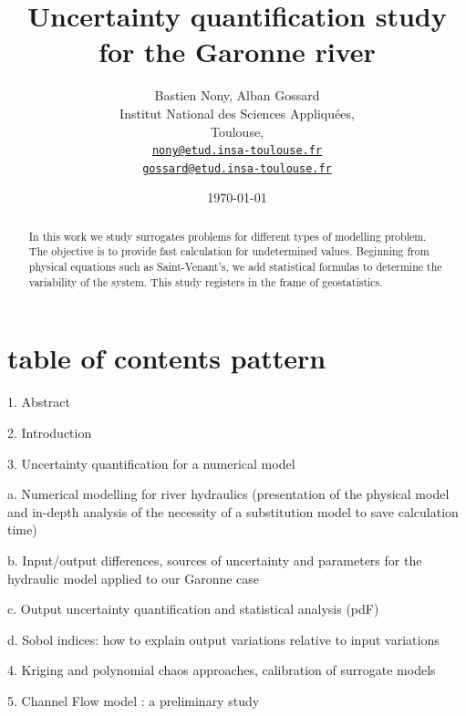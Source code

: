 \documentclass[hidelinks,12pt]{article}
\begin{document}
\title{Uncertainty quantification study for the Garonne river}
\author{Bastien Nony, Alban Gossard\\
Institut National des Sciences Appliquées,\\
Toulouse,\\
\href{mailto:nony@etud.insa-toulouse.fr}{   \texttt{nony@etud.insa-toulouse.fr}}\\
\href{mailto:gossard@etud.insa-toulouse.fr}{   \texttt{gossard@etud.insa-toulouse.fr}}}
\date{\today}

\maketitle

\begin{abstract}
In this work we study surrogates problems for different types of modelling problem. The objective is to provide fast calculation for undetermined values. Beginning from physical equations such as Saint-Venant's, we add statistical formulas to determine the variability of the system. This study registers in the frame of geostatistics.
\end{abstract}

\newpage

\tableofcontents


\section{table of contents pattern}


1.	Abstract


2.	Introduction


3.	Uncertainty quantification for a numerical model

a.	Numerical modelling for river hydraulics (presentation of the physical model and in-depth analysis of the necessity of a substitution model to save calculation time)

b.	Input/output differences, sources of uncertainty and parameters for the hydraulic model applied to our Garonne case

c.	Output uncertainty quantification and statistical analysis (pdF)

d.	Sobol indices: how to explain output variations relative to input variations


4.	Kriging and polynomial chaos approaches, calibration of surrogate models


5.	Channel Flow model : a preliminary study 
\end{document}
